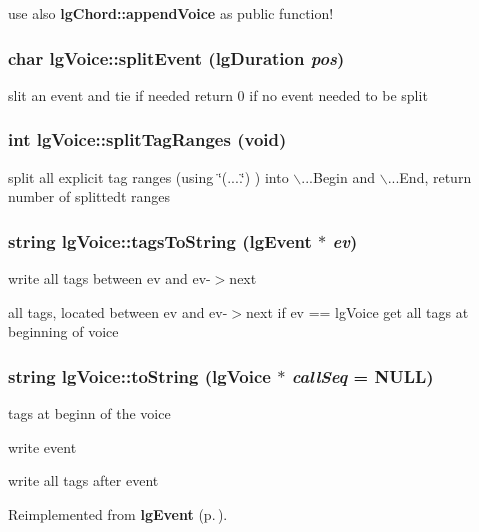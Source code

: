 use also {\bf lg\-Chord::append\-Voice} as public function! 

\subsubsection{\setlength{\rightskip}{0pt plus 5cm}char lg\-Voice::split\-Event ({\bf lg\-Duration} {\em pos})}\label{classlgVoice_a27}


slit an event and tie if needed return 0 if no event needed to be split 
\subsubsection{\setlength{\rightskip}{0pt plus 5cm}int lg\-Voice::split\-Tag\-Ranges (void)}\label{classlgVoice_a29}


split all explicit tag ranges (using \char`\"{}(....\char`\"{}) ) into $\backslash$...Begin and $\backslash$...End, return number of splittedt ranges 
\subsubsection{\setlength{\rightskip}{0pt plus 5cm}string lg\-Voice::tags\-To\-String ({\bf lg\-Event} $\ast$ {\em ev})}\label{classlgVoice_a11}


write all tags between ev and ev-$>$next 

all tags, located between ev and ev-$>$next if ev == lg\-Voice get all tags at beginning of voice 
\subsubsection{\setlength{\rightskip}{0pt plus 5cm}string lg\-Voice::to\-String ({\bf lg\-Voice} $\ast$ {\em call\-Seq} = NULL)\hspace{0.3cm}{\tt  [virtual]}}\label{classlgVoice_a20}


tags at beginn of the voice 

write event

write all tags after event 

Reimplemented from {\bf lg\-Event} {\rm (p.\,\pageref{classlgEvent_a1})}.

